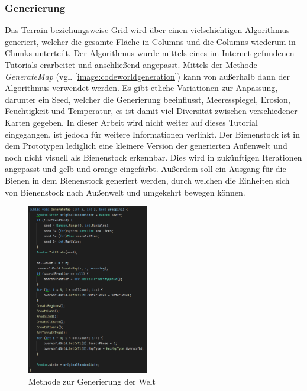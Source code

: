 \subsubsection{Generierung}
Das Terrain beziehungsweise Grid wird über einen vielschichtigen Algorithmus generiert, welcher die gesamte Fläche in Columns und die Columns wiederum in Chunks unterteilt. Der Algorithmus wurde mittels eines im Internet gefundenen Tutorials \cite*[]{world:tutorial} erarbeitet und anschließend angepasst. Mittels der Methode \textit{GenerateMap} (vgl. \autoref{image:codeworldgeneration}) kann von außerhalb dann der Algorithmus verwendet werden. Es gibt etliche Variationen zur Anpassung, darunter ein Seed, welcher die Generierung beeinflusst, Meeresspiegel, Erosion, Feuchtigkeit und Temperatur, es ist damit viel Diversität zwischen verschiedener Karten gegeben. In dieser Arbeit wird nicht weiter auf dieses Tutorial eingegangen, ist jedoch für weitere Informationen verlinkt. Der Bienenstock ist in dem Prototypen lediglich eine kleinere Version der generierten Außenwelt und noch nicht visuell als Bienenstock erkennbar. Dies wird in zukünftigen Iterationen angepasst und gelb und orange eingefärbt. Außerdem soll ein Ausgang für die Bienen in dem Bienenstock generiert werden, durch welchen die Einheiten sich von Bienenstock nach Außenwelt und umgekehrt bewegen können. 

\begin{figure}
    \begin{center}
        \includegraphics[width=200px]{0.bilder/codeworldgeneration.png}
    \end{center}
    \caption{Methode zur Generierung der Welt} \label{image:codeworldgeneration}
\end{figure}